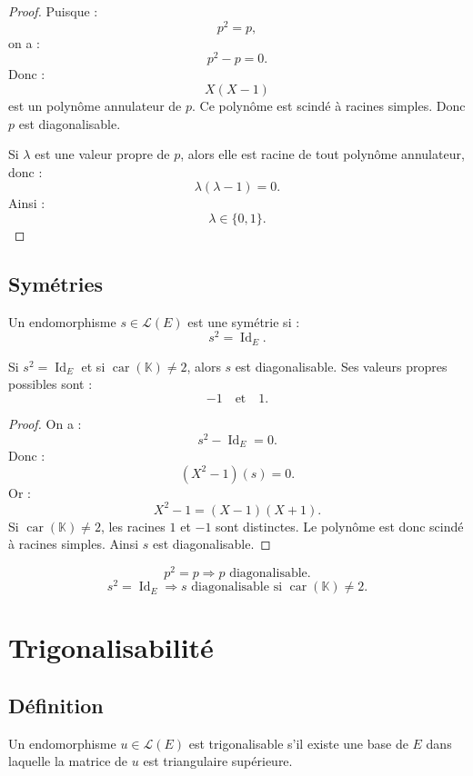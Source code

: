 \documentclass[11pt,a4paper]{article}
\newcommand{\K}{\mathbb K}
\newcommand{\Lcal}{\mathcal L}
\newcommand{\Id}{\operatorname{Id}}
\begin{document}
\begin{proof}
Puisque :
\[
p^2=p,
\]
on a :
\[
p^2-p=0.
\]
Donc :
\[
X(X-1)
\]
est un polynôme annulateur de \(p\).  
Ce polynôme est scindé à racines simples.  
Donc \(p\) est diagonalisable.

Si \(\lambda\) est une valeur propre de \(p\), alors elle est racine de tout polynôme annulateur, donc :
\[
\lambda(\lambda-1)=0.
\]
Ainsi :
\[
\lambda\in\{0,1\}.
\]
\end{proof}

\subsection{Symétries}

\begin{definitionbox}[Symétrie]
Un endomorphisme \(s\in\Lcal(E)\) est une symétrie si :
\[
s^2=\Id_E.
\]
\end{definitionbox}

\begin{theorembox}
Si \(s^2=\Id_E\) et si \(\operatorname{car}(\K)\neq2\), alors \(s\) est diagonalisable.  
Ses valeurs propres possibles sont :
\[
-1\quad\text{et}\quad 1.
\]
\end{theorembox}

\begin{proof}
On a :
\[
s^2-\Id_E=0.
\]
Donc :
\[
(X^2-1)(s)=0.
\]
Or :
\[
X^2-1=(X-1)(X+1).
\]
Si \(\operatorname{car}(\K)\neq2\), les racines \(1\) et \(-1\) sont distinctes.  
Le polynôme est donc scindé à racines simples.  
Ainsi \(s\) est diagonalisable.
\end{proof}

\begin{retenirbox}
\[
p^2=p \Longrightarrow p\text{ diagonalisable}.
\]
\[
s^2=\Id_E \Longrightarrow s\text{ diagonalisable si }\operatorname{car}(\K)\neq2.
\]
\end{retenirbox}

\section{Trigonalisabilité}

\subsection{Définition}

\begin{definitionbox}
Un endomorphisme \(u\in\Lcal(E)\) est trigonalisable s'il existe une base de \(E\) dans laquelle la matrice de \(u\) est triangulaire supérieure.
\end{definitionbox}
\end{document}
